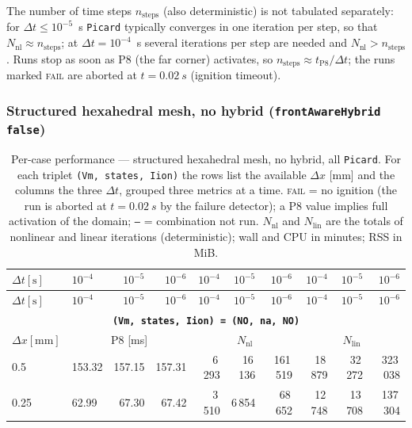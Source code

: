\documentclass[11pt,a4paper]{article}
\newcommand{\code}[1]{\texttt{\small #1}}
\begin{document}
The number of time steps $n_{\text{steps}}$ (also deterministic) is not tabulated
separately: for $\Delta t\le 10^{-5}$~s \code{Picard} typically converges in one
iteration per step, so that $N_{\mathrm{nl}}\approx n_{\text{steps}}$; at
$\Delta t=10^{-4}$~s several iterations per step are needed and
$N_{\mathrm{nl}}>n_{\text{steps}}$. Runs stop as soon as P8 (the far
corner) activates, so $n_{\text{steps}}\approx t_{\text{P8}}/\Delta t$; the
runs marked \textsc{fail} are aborted at $t=\SI{0.02}{s}$ (ignition timeout).

\subsubsection{Structured hexahedral mesh, no hybrid (\code{frontAwareHybrid false})}
\label{sec:res2d:hexaF}
\begin{center}\footnotesize
\begin{longtable}{l|lrr|rrr|rrr}
\caption{Per-case performance --- structured hexahedral mesh, no hybrid, all \code{Picard}. For each triplet \code{(Vm, states, Iion)} the rows list the available $\Delta x$ [mm] and the columns the three $\Delta t$, grouped three metrics at a time. \textsc{fail} = no ignition (the run is aborted at $t=\SI{0.02}{s}$ by the failure detector); a P8 value implies full activation of the domain; \texttt{--} = combination not run. $N_{\mathrm{nl}}$ and $N_{\mathrm{lin}}$ are the totals of nonlinear and linear iterations (deterministic); wall and CPU in minutes; RSS in MiB.}\label{tab:res2d:hexaF}\\
\toprule $ \Delta t [\text{s}]$ & $10^{-4}$ & $10^{-5}$ & $10^{-6}$ & $10^{-4}$ & $10^{-5}$ & $10^{-6}$ & $10^{-4}$ & $10^{-5}$ & $10^{-6}$\\ \midrule\endfirsthead
\toprule $ \Delta t [\text{s}]$ & $10^{-4}$ & $10^{-5}$ & $10^{-6}$ & $10^{-4}$ & $10^{-5}$ & $10^{-6}$ & $10^{-4}$ & $10^{-5}$ & $10^{-6}$\\ \midrule\endhead
\multicolumn{10}{c}{\textbf{\code{(Vm, states, Iion) = (NO, na, NO)}}}\\\hline
$ \Delta x [\text{mm}] $ & \multicolumn{3}{c|}{P8 [ms]} & \multicolumn{3}{c|}{$N_{\mathrm{nl}}$} & \multicolumn{3}{c|}{$N_{\mathrm{lin}}$}\\
0.5 & 153.32 & 157.15 & 157.31 & 6\,293 & 16\,136 & 161\,519 & 18\,879 & 32\,272 & 323\,038\\
0.25 & 62.99 & 67.30 & 67.42 & 3\,510 & 6\,854 & 68\,652 & 12\,748 & 13\,708 & 137\,304\\

\end{longtable}
\end{center}
\end{document}
